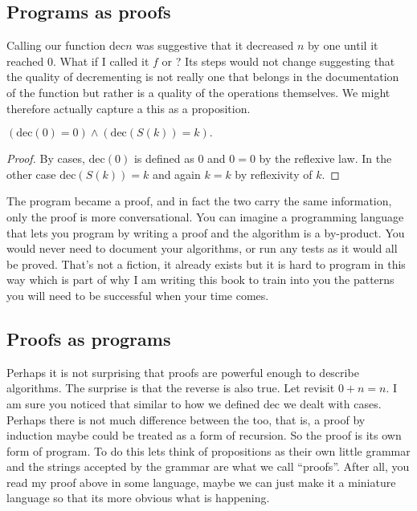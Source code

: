 \subsection{Programs as proofs}
Calling our function $\text{dec}{n}$ was suggestive that 
it decreased $n$ by one until it reached $0$.  What if I called 
it $f$ or ? Its steps would not change suggesting that 
the quality of decrementing is not really one that belongs in 
the documentation of the function but rather is a quality of the 
operations themselves.  We might therefore actually capture a 
this as a proposition.
\begin{proposition}
\(
    (\text{dec}(0)=0) \wedge (\text{dec}(S(k))=k).
\)
\end{proposition}
\begin{proof}
    By cases, $\text{dec}(0)$ is defined as $0$ and $0=0$ by 
    the reflexive law.  In the other case $\text{dec}(S(k))=k$ 
    and again $k=k$ by reflexivity of $k$.
\end{proof}
The program became a proof, and in fact the two carry the 
same information, only the proof is more conversational.
You can imagine a programming language that lets you program 
by writing a proof and the algorithm is a by-product.  You would 
never need to document your algorithms, or run any tests as 
it would all be proved.  That's not a fiction, it already exists
but it is hard to program in this way which is part of why I am 
writing this book to train into you the patterns you will need 
to be successful when your time comes.


\subsection{Proofs as programs}
Perhaps it is not surprising that proofs are powerful enough to 
describe algorithms.  The surprise is that the reverse is also true.
Let revisit $0+n=n$.  I am sure you noticed that similar to how 
we defined $\text{dec}$ we dealt with cases.  
Perhaps there is not much difference between the too, that is, 
a proof by induction maybe could be treated as a form of recursion. So the 
proof is its own form of program.  To do this lets think of 
propositions as their own little grammar and the strings accepted 
by the grammar are what we call ``proofs''.   After all, you read 
my proof above in some language, maybe we can just make it a 
miniature language so that its more obvious what is happening. 

